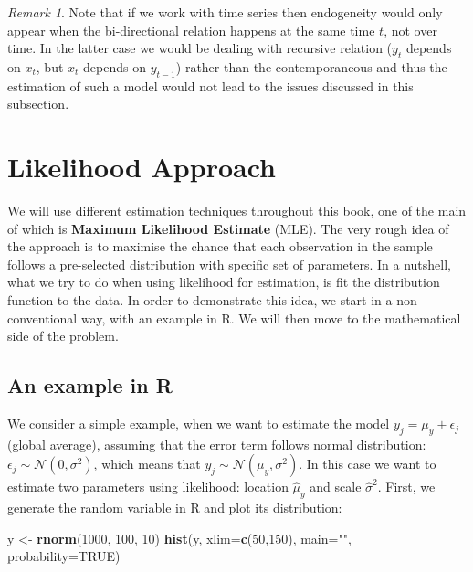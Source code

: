 \documentclass[
]{book}
\newenvironment{Shaded}{\begin{snugshade}}{\end{snugshade}}
\newcommand{\DataTypeTok}[1]{\textcolor[rgb]{0.13,0.29,0.53}{#1}}
\newcommand{\DecValTok}[1]{\textcolor[rgb]{0.00,0.00,0.81}{#1}}
\newcommand{\KeywordTok}[1]{\textcolor[rgb]{0.13,0.29,0.53}{\textbf{#1}}}
\newcommand{\NormalTok}[1]{#1}
\newcommand{\OtherTok}[1]{\textcolor[rgb]{0.56,0.35,0.01}{#1}}
\newcommand{\StringTok}[1]{\textcolor[rgb]{0.31,0.60,0.02}{#1}}
\theoremstyle{definition}
\theoremstyle{definition}
\theoremstyle{definition}
\theoremstyle{definition}
\theoremstyle{remark}
\newtheorem*{remark}{Remark}
\begin{document}
\begin{remark}
Note that if we work with time series then endogeneity would only appear when the bi-directional relation happens at the same time \(t\), not over time. In the latter case we would be dealing with recursive relation (\(y_t\) depends on \(x_{t}\), but \(x_t\) depends on \(y_{t-1}\)) rather than the contemporaneous and thus the estimation of such a model would not lead to the issues discussed in this subsection.
\end{remark}

\hypertarget{likelihoodApproach}{%
\chapter{Likelihood Approach}\label{likelihoodApproach}}

We will use different estimation techniques throughout this book, one of the main of which is \textbf{Maximum Likelihood Estimate} (MLE). The very rough idea of the approach is to maximise the chance that each observation in the sample follows a pre-selected distribution with specific set of parameters. In a nutshell, what we try to do when using likelihood for estimation, is fit the distribution function to the data. In order to demonstrate this idea, we start in a non-conventional way, with an example in R. We will then move to the mathematical side of the problem.

\hypertarget{likelihoodInR}{%
\section{An example in R}\label{likelihoodInR}}

We consider a simple example, when we want to estimate the model \(y_j = \mu_y + \epsilon_j\) (global average), assuming that the error term follows normal distribution: \(\epsilon_j \sim \mathcal{N}(0, \sigma^2)\), which means that \(y_j \sim \mathcal{N}(\mu_{y}, \sigma^2)\). In this case we want to estimate two parameters using likelihood: location \(\hat{\mu}_y\) and scale \(\hat{\sigma}^2\). First, we generate the random variable in R and plot its distribution:

\begin{Shaded}
\begin{Highlighting}[]
\NormalTok{y \textless{}{-}}\StringTok{ }\KeywordTok{rnorm}\NormalTok{(}\DecValTok{1000}\NormalTok{, }\DecValTok{100}\NormalTok{, }\DecValTok{10}\NormalTok{)}
\KeywordTok{hist}\NormalTok{(y, }\DataTypeTok{xlim=}\KeywordTok{c}\NormalTok{(}\DecValTok{50}\NormalTok{,}\DecValTok{150}\NormalTok{), }\DataTypeTok{main=}\StringTok{""}\NormalTok{, }\DataTypeTok{probability=}\OtherTok{TRUE}\NormalTok{)}
\end{Highlighting}
\end{Shaded}
\end{document}
